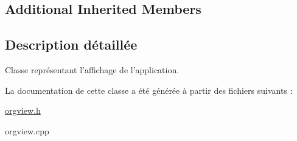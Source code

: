 \subsection*{Additional Inherited Members}


\subsection{Description détaillée}
Classe représentant l'affichage de l'application. 

La documentation de cette classe a été générée à partir des fichiers suivants \-:\begin{DoxyCompactItemize}
\item 
\hyperlink{orgview_8h}{orgview.\-h}\item 
orgview.\-cpp\end{DoxyCompactItemize}

